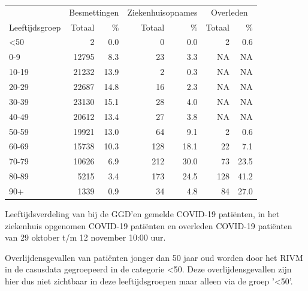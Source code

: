\documentclass[
  english,
  man,floatsintext]{apa6}
\begin{document}
\begin{table}
\centering\begingroup\fontsize{11}{13}\selectfont

\begin{threeparttable}
\begin{tabular}{lrrrrrr}
\toprule
\multicolumn{1}{c}{ } & \multicolumn{2}{c}{Besmettingen} & \multicolumn{2}{c}{Ziekenhuisopnames} & \multicolumn{2}{c}{Overleden} \\
\cmidrule(l{3pt}r{3pt}){2-3} \cmidrule(l{3pt}r{3pt}){4-5} \cmidrule(l{3pt}r{3pt}){6-7}
Leeftijdsgroep & Totaal & \% & Totaal & \% & Totaal & \%\\
\midrule
<50 & 2 & 0.0 & 0 & 0.0 & 2 & 0.6\\
0-9 & 12795 & 8.3 & 23 & 3.3 & NA & NA\\
10-19 & 21232 & 13.9 & 2 & 0.3 & NA & NA\\
20-29 & 22687 & 14.8 & 16 & 2.3 & NA & NA\\
30-39 & 23130 & 15.1 & 28 & 4.0 & NA & NA\\
40-49 & 20612 & 13.4 & 27 & 3.8 & NA & NA\\
50-59 & 19921 & 13.0 & 64 & 9.1 & 2 & 0.6\\
60-69 & 15738 & 10.3 & 128 & 18.1 & 22 & 7.1\\
70-79 & 10626 & 6.9 & 212 & 30.0 & 73 & 23.5\\
80-89 & 5215 & 3.4 & 173 & 24.5 & 128 & 41.2\\
90+ & 1339 & 0.9 & 34 & 4.8 & 84 & 27.0\\
\bottomrule
\end{tabular}
\begin{tablenotes}
\item[1] Leeftijdsverdeling van bij de GGD’en gemelde COVID-19 patiënten, in het ziekenhuis opgenomen COVID-19 patiënten en overleden COVID-19 patiënten van 29 oktober t/m 12 november 10:00 uur.
\item[2] Overlijdensgevallen van patiënten jonger dan 50 jaar oud worden door het RIVM in de casusdata gegroepeerd in de categorie <50. Deze overlijdensgevallen zijn hier dus niet zichtbaar in deze leeftijdsgroepen maar alleen via de groep '<50'.
\end{tablenotes}
\end{threeparttable}
\endgroup{}
\end{table}

\newpage
\end{document}
